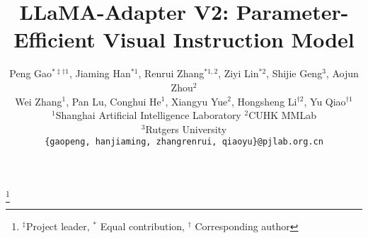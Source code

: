\documentclass[10pt,twocolumn,letterpaper]{article}
\newcommand\blfootnote[1]{\begingroup
  \renewcommand\thefootnote{}\footnote{#1}\addtocounter{footnote}{-1}\endgroup
}
\begin{document}
\title{LLaMA-Adapter V2: Parameter-Efficient Visual Instruction Model}

\author{
Peng Gao$^{*\ddagger\dag1}$, Jiaming Han$^{*1}$, Renrui Zhang$^{*1,2}$, Ziyi Lin$^{*2}$, Shijie Geng$^{3}$, Aojun Zhou$^{2}$ \\ Wei Zhang$^{1}$, Pan Lu, Conghui He$^{1}$, Xiangyu Yue$^{2}$, Hongsheng Li$^{\dag2}$, Yu Qiao$^{\dag1}$\vspace{0.2cm}\\
$^1$Shanghai Artificial Intelligence Laboratory\quad 
$^2$CUHK MMLab\\
$^3$Rutgers University\\
\texttt{\small \{gaopeng, hanjiaming, zhangrenrui, qiaoyu\}@pjlab.org.cn}
}
\maketitle

\blfootnote{$^\ddagger$Project leader, $^*$ Equal contribution, $^\dag$ Corresponding author}


\end{document}
